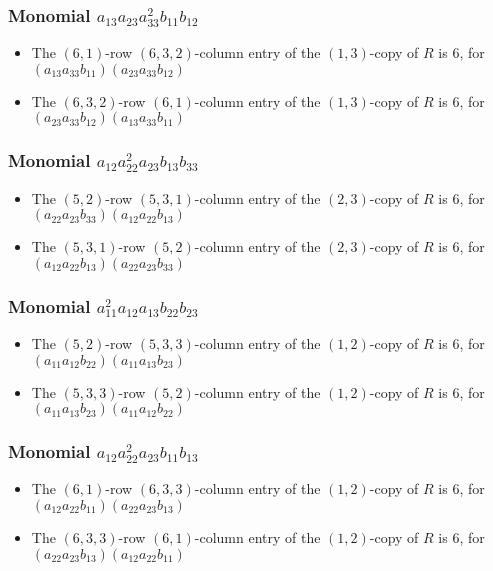 \documentclass{article}
\begin{document}
\subsubsection{Monomial $ a_{13} a_{23} a_{33}^{2} b_{11} b_{12} $}

\begin{itemize}
\item The $(6, 1)$-row $(6, 3, 2)$-column entry of the $ \left(1, 3\right) $-copy of $R$ is $ 6 $, for $( a_{13} a_{33} b_{11} )( a_{23} a_{33} b_{12} )$ 
\item The $(6, 3, 2)$-row $(6, 1)$-column entry of the $ \left(1, 3\right) $-copy of $R$ is $ 6 $, for $( a_{23} a_{33} b_{12} )( a_{13} a_{33} b_{11} )$ 
\end{itemize}
\subsubsection{Monomial $ a_{12} a_{22}^{2} a_{23} b_{13} b_{33} $}

\begin{itemize}
\item The $(5, 2)$-row $(5, 3, 1)$-column entry of the $ \left(2, 3\right) $-copy of $R$ is $ 6 $, for $( a_{22} a_{23} b_{33} )( a_{12} a_{22} b_{13} )$ 
\item The $(5, 3, 1)$-row $(5, 2)$-column entry of the $ \left(2, 3\right) $-copy of $R$ is $ 6 $, for $( a_{12} a_{22} b_{13} )( a_{22} a_{23} b_{33} )$ 
\end{itemize}
\subsubsection{Monomial $ a_{11}^{2} a_{12} a_{13} b_{22} b_{23} $}

\begin{itemize}
\item The $(5, 2)$-row $(5, 3, 3)$-column entry of the $ \left(1, 2\right) $-copy of $R$ is $ 6 $, for $( a_{11} a_{12} b_{22} )( a_{11} a_{13} b_{23} )$ 
\item The $(5, 3, 3)$-row $(5, 2)$-column entry of the $ \left(1, 2\right) $-copy of $R$ is $ 6 $, for $( a_{11} a_{13} b_{23} )( a_{11} a_{12} b_{22} )$ 
\end{itemize}
\subsubsection{Monomial $ a_{12} a_{22}^{2} a_{23} b_{11} b_{13} $}

\begin{itemize}
\item The $(6, 1)$-row $(6, 3, 3)$-column entry of the $ \left(1, 2\right) $-copy of $R$ is $ 6 $, for $( a_{12} a_{22} b_{11} )( a_{22} a_{23} b_{13} )$ 
\item The $(6, 3, 3)$-row $(6, 1)$-column entry of the $ \left(1, 2\right) $-copy of $R$ is $ 6 $, for $( a_{22} a_{23} b_{13} )( a_{12} a_{22} b_{11} )$ 
\end{itemize}
\end{document}
